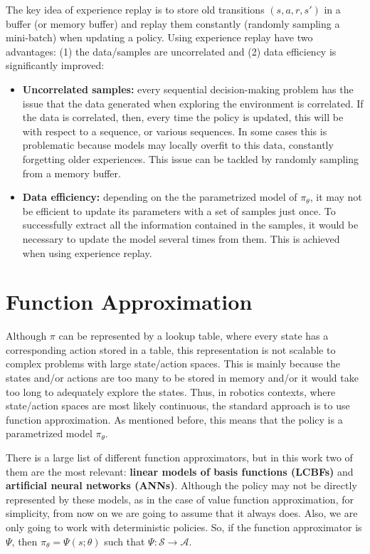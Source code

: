 The key idea of experience replay is to store old transitions $(s, a, r, s')$ in a buffer (or memory buffer) and replay them constantly (randomly sampling a mini-batch) when updating a policy. Using experience replay have two advantages: (1) the data/samples are uncorrelated and (2) data efficiency is significantly improved:

\begin{itemize}
    \item \textbf{Uncorrelated samples:} every sequential decision-making problem has the issue that the data generated when exploring the environment is correlated. If the data is correlated, then, every time the policy is updated, this will be with respect to a sequence, or various sequences. In some cases this is problematic because models may locally overfit to this data, constantly forgetting older experiences. This issue can be tackled by randomly sampling from a memory buffer.
    
    \item\textbf{Data efficiency:} depending on the the parametrized model of $\pi_{\theta}$, it may not be efficient to update its parameters with a set of samples just once. To successfully extract all the information contained in the samples, it would be necessary to update the model several times from them. This is achieved when using experience replay.
\end{itemize}

\section{Function Approximation}
Although $\pi$ can be represented by a lookup table, where every state has a corresponding action stored in a table, this representation is not scalable to complex problems with large state/action spaces. This is mainly because the states and/or actions are too many to be stored in memory and/or it would take too long to adequately explore the states. Thus, in robotics contexts, where state/action spaces are most likely continuous, the standard approach is to use function approximation. As mentioned before, this means that the policy is a parametrized model $\pi_{\theta}$.

There is a large list of different function approximators, but in this work two of them are the most relevant: \textbf{linear models of basis functions (LCBFs)} and \textbf{artificial neural networks (ANNs)}. Although the policy may not be directly represented by these models, as in the case of value function approximation, for simplicity, from now on we are going to assume that it always does. Also, we are only going to work with deterministic policies. So, if the function approximator is $\Psi$, then $\pi_{\theta} = \Psi(s;\theta)$ such that $\Psi: \mathcal{S} \to \mathcal{A}$.

